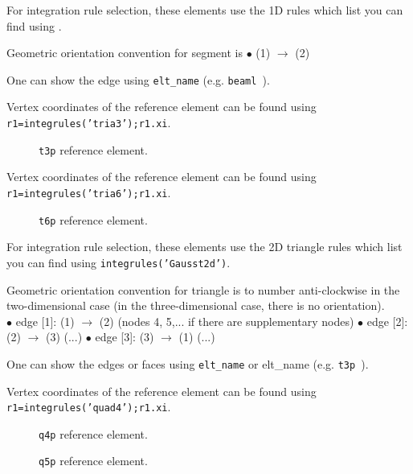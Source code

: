 For integration rule selection, these elements use the 1D rules which list you can find using .

Geometric orientation convention for segment  is $\bullet$ (1) $\rightarrow$ (2)

One can show the edge using {\tt {\ti elt\_name}}  (e.g. {\tt beaml }).


Vertex coordinates of the reference element can be found using {\tt r1=integrules('tria3');r1.xi}.

\begin{figure}[H]
\centering
{} 
 \caption{{\tt t3p} reference element.}
\end{figure}

Vertex coordinates of the reference element can be found using {\tt r1=integrules('tria6');r1.xi}.

\begin{figure}[H]
\centering
{} 
 \caption{{\tt t6p} reference element.}
\end{figure}

For integration rule selection, these elements use the 2D triangle rules which list you can find using {\tt integrules('Gausst2d')}.

Geometric orientation convention for triangle is to number anti-clockwise in the
two-dimensional case (in the three-dimensional case, there is no orientation).\\
   $\bullet$ edge [1]: (1) $\rightarrow$ (2)  (nodes 4, 5,... if there are supplementary nodes) 
   $\bullet$ edge [2]: (2) $\rightarrow$ (3)  (...) 
   $\bullet$ edge [3]: (3) $\rightarrow$ (1)  (...)

One can show the edges or faces using {\tt {\ti elt\_name}}  or {\ti elt\_name}  (e.g. {\tt t3p }).


Vertex coordinates of the reference element can be found using {\tt r1=integrules('quad4');r1.xi}.

\begin{figure}[H]
\centering
{} 
 \caption{{\tt q4p} reference element.}
\end{figure}

\begin{figure}[H]
\centering
{} 
 \caption{{\tt q5p} reference element.}
\end{figure}

